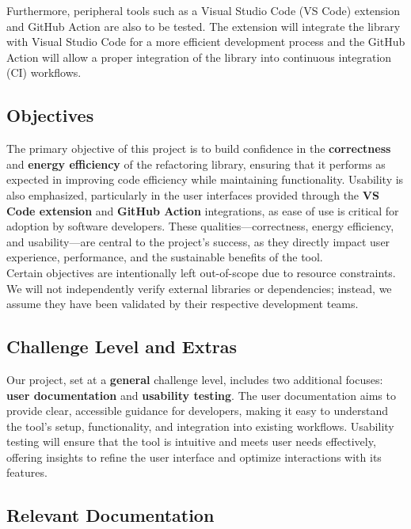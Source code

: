 \documentclass[12pt, titlepage]{article}
\begin{document}
Furthermore, peripheral tools such as a Visual Studio Code (VS Code) extension and GitHub Action are also to be tested. The extension will integrate the library with Visual Studio Code for a more efficient development process and the GitHub Action will allow a proper integration of the library into continuous integration (CI) workflows.

\subsection{Objectives}

The primary objective of this project is to build confidence in the \textbf{correctness} and \textbf{energy efficiency} of the refactoring library, ensuring that it performs as expected in improving code efficiency while maintaining functionality. Usability is also emphasized, particularly in the user interfaces provided through the \textbf{VS Code extension} and \textbf{GitHub Action} integrations, as ease of use is critical for adoption by software developers. These qualities—correctness, energy efficiency, and usability—are central to the project’s success, as they directly impact user experience, performance, and the sustainable benefits of the tool.\\

Certain objectives are intentionally left out-of-scope due to resource constraints. We will not independently verify external libraries or dependencies; instead, we assume they have been validated by their respective development teams. 

\subsection{Challenge Level and Extras}

Our project, set at a \textbf{general} challenge level, includes two additional focuses: \textbf{user documentation} and \textbf{usability testing}. The user documentation aims to provide clear, accessible guidance for developers, making it easy to understand the tool’s setup, functionality, and integration into existing workflows. Usability testing will ensure that the tool is intuitive and meets user needs effectively, offering insights to refine the user interface and optimize interactions with its features.

\subsection{Relevant Documentation}
\end{document}
